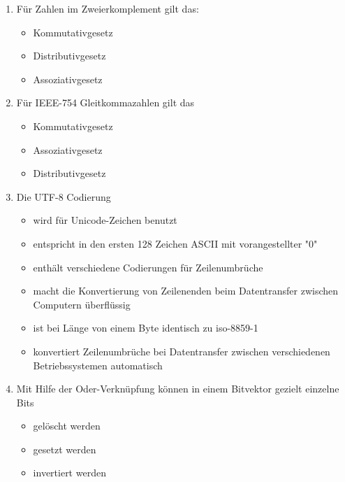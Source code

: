 \documentclass{article}
\begin{document}
\begin{enumerate}
  \item Für Zahlen im Zweierkomplement gilt das:
        \begin{itemize}
          \item Kommutativgesetz \psolution{\checkmark}
          \item Distributivgesetz \psolution{\checkmark}
          \item Assoziativgesetz \psolution{\checkmark}
        \end{itemize}
  \item Für IEEE-754 Gleitkommazahlen gilt das
        \begin{itemize}
          \item Kommutativgesetz \psolution{\checkmark}
          \item Assoziativgesetz \psolution{\xmark}
          \item Distributivgesetz \psolution{\xmark}
        \end{itemize}
  \item Die UTF-8 Codierung
        \begin{itemize}
          \item wird für Unicode-Zeichen benutzt \psolution{\checkmark}
          \item entspricht in den ersten 128 Zeichen ASCII mit vorangestellter "0" \psolution{\checkmark}
          \item enthält verschiedene Codierungen für Zeilenumbrüche \psolution{\checkmark}
          \item macht die Konvertierung von Zeilenenden beim Datentransfer zwischen Computern überflüssig \psolution{\xmark}
          \item ist bei Länge von einem Byte identisch zu iso-8859-1 \psolution{\checkmark}
          \item konvertiert Zeilenumbrüche bei Datentransfer zwischen verschiedenen Betriebssystemen automatisch \psolution{\xmark}
        \end{itemize}
  \item Mit Hilfe der Oder-Verknüpfung können in einem Bitvektor gezielt einzelne Bits
        \begin{itemize}
          \item gelöscht werden \psolution{\xmark}
          \item gesetzt werden \psolution{\checkmark}
          \item invertiert werden \psolution{\xmark}

\end{itemize}
\end{enumerate}
\end{document}
